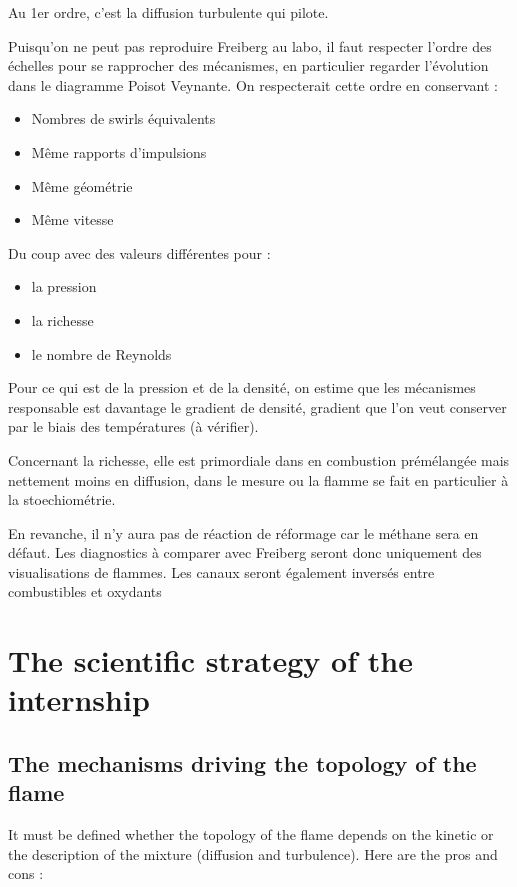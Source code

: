 Au 1er ordre, c'est la diffusion turbulente qui pilote.

Puisqu'on ne peut pas reproduire Freiberg au labo, il faut respecter l'ordre des échelles pour se rapprocher des mécanismes, en particulier regarder l'évolution dans le diagramme Poisot Veynante. On respecterait cette ordre en conservant :
\begin{itemize}
\item Nombres de swirls équivalents
\item Même rapports d'impulsions
\item Même géométrie
\item Même vitesse
\end{itemize}
Du coup avec des valeurs différentes pour :
\begin{itemize}
\item la pression
\item la richesse
\item le nombre de Reynolds
\end{itemize}
Pour ce qui est de la pression et de la densité, on estime que les mécanismes responsable est davantage le gradient de densité, gradient que l'on veut conserver par le biais des températures (à vérifier).

Concernant la richesse, elle est primordiale dans en combustion prémélangée mais nettement moins en diffusion, dans le mesure ou la flamme se fait en particulier à la stoechiométrie. 

En revanche, il n'y aura pas de réaction de réformage car le méthane sera en défaut. Les diagnostics à comparer avec Freiberg seront donc uniquement des visualisations de flammes. Les canaux seront également inversés entre combustibles et oxydants

\section{The scientific strategy of the internship}

\subsection{The mechanisms driving the topology of the flame}

It must be defined whether the topology of the flame depends on the kinetic or the description of the mixture (diffusion and turbulence). Here are the pros and cons :
